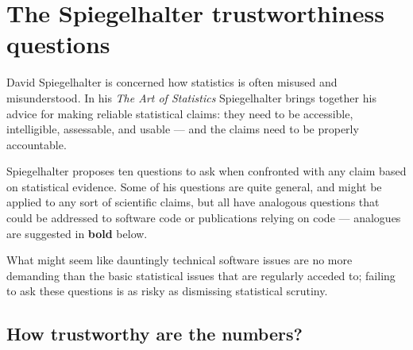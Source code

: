 \documentclass[10pt,a4paper]{article}
\begin{document}
\section{The Spiegelhalter trustworthiness questions}
\label{supplement-Spiegelhalter-section}

David Spiegelhalter is concerned how statistics is often misused and misunderstood. In his \emph{The Art of Statistics\/} \cite{Spiegelhalter} Spiegelhalter brings together his advice for making reliable statistical claims: they need to be accessible, intelligible, assessable, and usable --- and the claims need to be properly accountable. 

Spiegelhalter proposes ten questions to ask when confronted with any claim based on statistical evidence. Some of his questions are quite general, and might be applied to any sort of scientific claims, but all have analogous questions that could be addressed to software code or publications relying on code --- analogues are suggested in \textbf{bold} below. 

What might seem like dauntingly technical software issues are no more demanding than the basic statistical issues that are regularly acceded to; failing to ask these questions is as risky as dismissing statistical scrutiny.

\def\question#1{\item \emph{#1\/}}
\def\sequestion#1{\begin{itemize}\raggedright\item[$\blacktriangleright$] \textbf{#1}\end{itemize}}

\subsection{How trustworthy are the numbers?}
\end{document}
